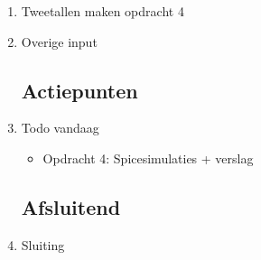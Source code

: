\documentclass{article}
\begin{document}
\begin{enumerate}
	\item Tweetallen maken opdracht 4
	\item Overige input
	\subsection*{Actiepunten}
	\item Todo vandaag
	\begin{itemize}
		\item Opdracht 4: Spicesimulaties + verslag
	\end{itemize}

	\noindent 
	\subsection*{Afsluitend}
	\item Sluiting

\end{enumerate}
\end{document}

